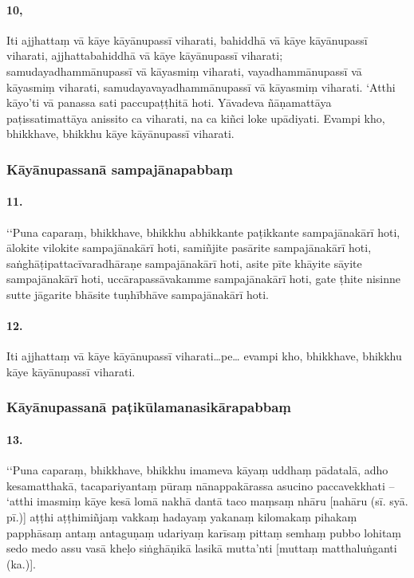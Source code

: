 \paragraph{10,} Iti ajjhattaṃ vā kāye kāyānupassī viharati, bahiddhā vā kāye kāyānupassī viharati, ajjhattabahiddhā vā kāye kāyānupassī viharati; samudayadhammānupassī vā kāyasmiṃ viharati, vayadhammānupassī vā kāyasmiṃ viharati, samudayavayadhammānupassī vā kāyasmiṃ viharati. ‘Atthi kāyo’ti vā panassa sati paccupaṭṭhitā hoti. Yāvadeva ñāṇamattāya paṭissatimattāya anissito ca viharati, na ca kiñci loke upādiyati. Evampi kho, bhikkhave, bhikkhu kāye kāyānupassī viharati.


\subsubsection{Kāyānupassanā sampajānapabbaṃ}

\paragraph{11.} ‘‘Puna caparaṃ, bhikkhave, bhikkhu abhikkante paṭikkante sampajānakārī hoti, ālokite vilokite sampajānakārī hoti, samiñjite pasārite sampajānakārī hoti, saṅghāṭipattacīvaradhāraṇe sampajānakārī hoti, asite pīte khāyite sāyite sampajānakārī hoti, uccārapassāvakamme sampajānakārī hoti, gate ṭhite nisinne sutte jāgarite bhāsite tuṇhībhāve sampajānakārī hoti.

\paragraph{12.} Iti ajjhattaṃ vā kāye kāyānupassī viharati…pe… evampi kho, bhikkhave, bhikkhu kāye kāyānupassī viharati.


\subsubsection{Kāyānupassanā paṭikūlamanasikārapabbaṃ}

\paragraph{13.} ‘‘Puna caparaṃ, bhikkhave, bhikkhu imameva kāyaṃ uddhaṃ pādatalā, adho kesamatthakā, tacapariyantaṃ pūraṃ nānappakārassa asucino paccavekkhati – ‘atthi imasmiṃ kāye kesā lomā nakhā dantā taco maṃsaṃ nhāru [nahāru (sī. syā. pī.)] aṭṭhi aṭṭhimiñjaṃ vakkaṃ hadayaṃ yakanaṃ kilomakaṃ pihakaṃ papphāsaṃ antaṃ antaguṇaṃ udariyaṃ karīsaṃ pittaṃ semhaṃ pubbo lohitaṃ sedo medo assu vasā kheḷo siṅghāṇikā lasikā mutta’nti [muttaṃ matthaluṅganti (ka.)].

